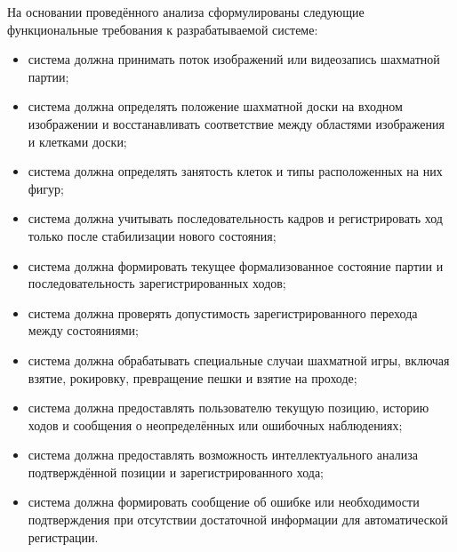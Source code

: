 На основании проведённого анализа сформулированы следующие функциональные требования к разрабатываемой системе:
\begin{itemize}
    \item система должна принимать поток изображений или видеозапись шахматной партии;
    \item система должна определять положение шахматной доски на входном изображении и восстанавливать соответствие между областями изображения и клетками доски;
    \item система должна определять занятость клеток и типы расположенных на них фигур;
    \item система должна учитывать последовательность кадров и регистрировать ход только после стабилизации нового состояния;
    \item система должна формировать текущее формализованное состояние партии и последовательность зарегистрированных ходов;
    \item система должна проверять допустимость зарегистрированного перехода между состояниями;
    \item система должна обрабатывать специальные случаи шахматной игры, включая взятие, рокировку, превращение пешки и взятие на проходе;
    \item система должна предоставлять пользователю текущую позицию, историю ходов и сообщения о неопределённых или ошибочных наблюдениях;
    \item система должна предоставлять возможность интеллектуального анализа подтверждённой позиции и зарегистрированного хода;
    \item система должна формировать сообщение об ошибке или необходимости подтверждения при отсутствии достаточной информации для автоматической регистрации.
\end{itemize}

